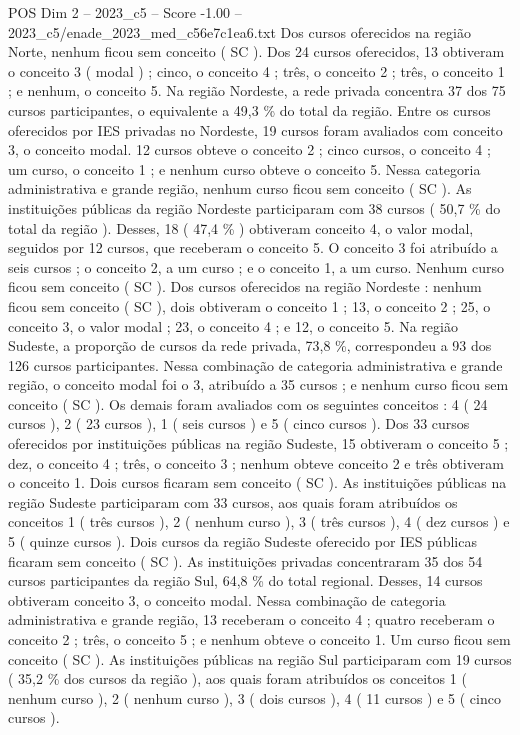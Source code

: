 \begin{textsample}{POS Dim 2 – 2023\_c5 – Score -1.00 – 2023\_c5/enade\_2023\_med\_c56e7c1ea6.txt}
Dos cursos oferecidos na região Norte, nenhum ficou sem conceito ( SC ).
Dos 24 cursos oferecidos, 13 obtiveram o conceito 3 ( modal ) ; cinco, o conceito 4 ; três, o conceito 2 ; três, o conceito 1 ; e nenhum, o conceito 5.
Na região Nordeste, a rede privada concentra 37 dos 75 cursos participantes, o equivalente a 49,3 \% do total da região.
Entre os cursos oferecidos por IES privadas no Nordeste, 19 cursos foram avaliados com conceito 3, o conceito modal. 12 cursos obteve o conceito 2 ; cinco cursos, o conceito 4 ; um curso, o conceito 1 ; e nenhum curso obteve o conceito 5.
Nessa categoria administrativa e grande região, nenhum curso ficou sem conceito ( SC ).
As instituições públicas da região Nordeste participaram com 38 cursos ( 50,7 \% do total da região ).
Desses, 18 ( 47,4 \% ) obtiveram conceito 4, o valor modal, seguidos por 12 cursos, que receberam o conceito 5.
O conceito 3 foi atribuído a seis cursos ; o conceito 2, a um curso ; e o conceito 1, a um curso.
Nenhum curso ficou sem conceito ( SC ).
Dos cursos oferecidos na região Nordeste : nenhum ficou sem conceito ( SC ), dois obtiveram o conceito 1 ; 13, o conceito 2 ; 25, o conceito 3, o valor modal ; 23, o conceito 4 ; e 12, o conceito 5.
Na região Sudeste, a proporção de cursos da rede privada, 73,8 \%, correspondeu a 93 dos 126 cursos participantes.
Nessa combinação de categoria administrativa e grande região, o conceito modal foi o 3, atribuído a 35 cursos ; e nenhum curso ficou sem conceito ( SC ).
Os demais foram avaliados com os seguintes conceitos : 4 ( 24 cursos ), 2 ( 23 cursos ), 1 ( seis cursos ) e 5 ( cinco cursos ).
Dos 33 cursos oferecidos por instituições públicas na região Sudeste, 15 obtiveram o conceito 5 ; dez, o conceito 4 ; três, o conceito 3 ; nenhum obteve conceito 2 e três obtiveram o conceito 1.
Dois cursos ficaram sem conceito ( SC ).
As instituições públicas na região Sudeste participaram com 33 cursos, aos quais foram atribuídos os conceitos 1 ( três cursos ), 2 ( nenhum curso ), 3 ( três cursos ), 4 ( dez cursos ) e 5 ( quinze cursos ).
Dois cursos da região Sudeste oferecido por IES públicas ficaram sem conceito ( SC ).
As instituições privadas concentraram 35 dos 54 cursos participantes da região Sul, 64,8 \% do total regional.
Desses, 14 cursos obtiveram conceito 3, o conceito modal.
Nessa combinação de categoria administrativa e grande região, 13 receberam o conceito 4 ; quatro receberam o conceito 2 ; três, o conceito 5 ; e nenhum obteve o conceito 1.
Um curso ficou sem conceito ( SC ).
As instituições públicas na região Sul participaram com 19 cursos ( 35,2 \% dos cursos da região ), aos quais foram atribuídos os conceitos 1 ( nenhum curso ), 2 ( nenhum curso ), 3 ( dois cursos ), 4 ( 11 cursos ) e 5 ( cinco cursos ).

\end{textsample}
